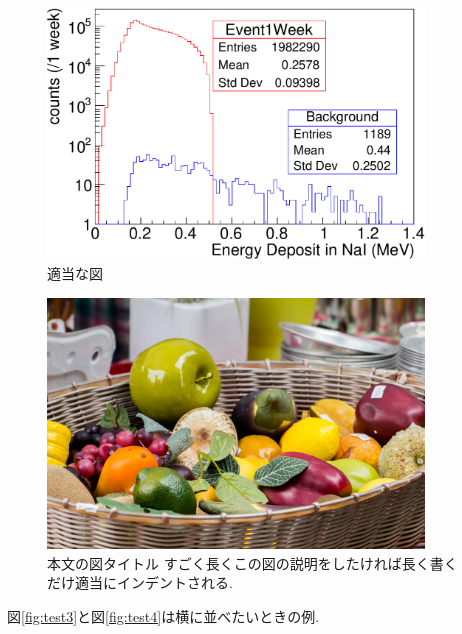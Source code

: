 \begin{figure}[tb]
	\centering
	\includegraphics[width=10cm]{fig/figure.pdf}
	\caption{適当な図}
	\label{fig:test1}
\end{figure}

\begin{figure}[tb]
	\centering
	\includegraphics[width=10cm]{fig/image.jpg}
	\caption[ここが目次の図タイトル]{本文の図タイトル \newline すごく長くこの図の説明をしたければ長く書くだけ適当にインデントされる.}
	\label{fig:test2}
\end{figure}

図\ref{fig:test3}と図\ref{fig:test4}は横に並べたいときの例.


